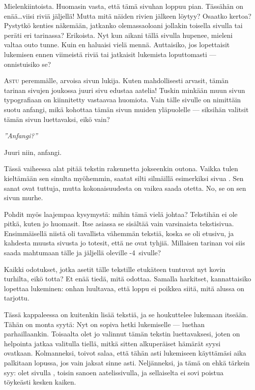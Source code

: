 \documentclass[a4paper, 12pt, finnish]{article}
\newcommand{\reader}[1]{\emph{#1}}
\newcommand{\q}[1]{''#1''}
\begin{document}
Mielenkiintoista. Huomasin vasta, että tämä sivuhan loppuu pian.
Tässähän on enää\ldots viisi riviä jäljellä! Mutta mitä
näiden rivien jälkeen löytyy? Osaatko kertoa?
Pystytkö kenties näkemään, jatkanko olemassaoloani 
jollakin toisella sivulla tai peräti eri tarinassa?
Erikoista. Nyt kun aikani tällä
sivulla hupenee, mieleni valtaa outo tunne. Kuin en
haluaisi vielä mennä. Auttaisiko, jos lopettaisit
lukemisen ennen viimeistä riviä tai jatkaisit lukemista
loputtomasti --- onnistuisiko se?

\newpage
\mbox{}\label{aatelinen}
\lettrine{A}{stu} peremmälle, arvoisa sivun \pageref{etusivu} lukija.
Kuten mahdollisesti arvasit, tämän tarinan sivujen joukossa juuri
sivu \pageref{aatelinen} edustaa aatelia! Tuskin minkään muun sivun typografiaan on kiinnitetty vastaavaa huomiota. Vain tälle sivulle
on nimittäin suotu anfangi, mikä kohottaa tämän sivun muiden
yläpuolelle --- siksihän valitsit tämän sivun luettavaksi,
eikö vain?
 
\reader{\q{Anfangi?}}

Juuri niin, anfangi.

Tässä vaiheessa alat pitää tekstin rakennetta jokseenkin
outona. Vaikka tulen kieltämään sen sinulta myöhemmin,
saatat silti silmäillä esimerkiksi sivua \pageref{weirdpage}.
Sen sanat ovat tuttuja, mutta kokonaisuudesta on vaikea
saada otetta. No, se on sen sivun murhe.

Pohdit myös laajempaa kysymystä: mihin tämä vielä johtaa?
Tekstihän ei ole pitkä, kuten jo huomasit. Itse asiassa
se sisältää vain \pageref{lastpage} varsinaista tekstisivua.
Ensimmäisellä niistä oli tavallista vähemmän tekstiä, koska se
oli etusivu, ja kahdesta muusta sivusta jo totesit, että ne
ovat tyhjiä. Millaisen tarinan voi siis saada mahtumaan tälle
ja jäljellä oleville
\number\numexpr{}-4\relax\
sivulle?

Kaikki odotukset, jotka asetit tälle tekstille etukäteen
tuntuvat nyt kovin turhilta, eikö totta? Et enää tiedä,
mitä odottaa. Samalla harkitset, kannattaisiko lopettaa
lukeminen: onhan luultavaa, että loppu ei poikkea siitä,
mitä alussa on tarjottu.

Tässä kappaleessa on kuitenkin lisää tekstiä, ja se houkuttelee
lukemaan itseään. Tähän on monta syytä: Nyt on sopiva
hetki lukemiselle --- luethan parhaillaankin. Toisaalta
olet jo valinnut tämän tekstin luettavaksesi, joten on
helpointa jatkaa valitulla tiellä, mitkä sitten alkuperäiset
hämärät syysi ovatkaan. Kolmanneksi, toivot salaa, että tähän
asti lukemiseen käyttämäsi aika palkitaan lopussa, jos vain
jaksat sinne asti. Neljänneksi, ja tämä on ehkä tärkein syy:
olet sivulla \pageref{aatelinen}, toisin sanoen aatelissivulla,
ja sellaiselta ei sovi poistua töykeästi kesken kaiken.
\end{document}
